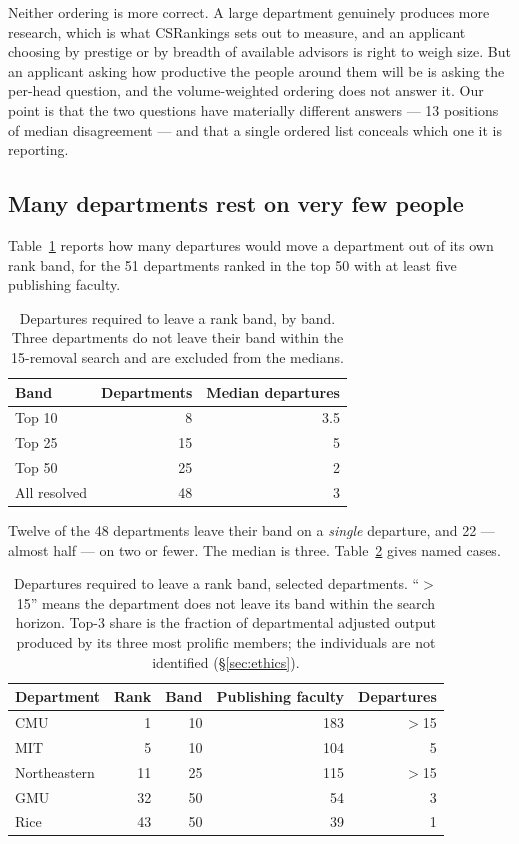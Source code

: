 \documentclass[11pt]{article}
\newcommand{\csr}{CSRankings}
\begin{document}
Neither ordering is more correct. A large department genuinely produces more
research, which is what \csr{} sets out to measure, and an applicant choosing
by prestige or by breadth of available advisors is right to weigh size. But an
applicant asking how productive the people around them will be is asking the
per-head question, and the volume-weighted ordering does not answer it. Our
point is that the two questions have materially different answers --- 13
positions of median disagreement --- and that a single ordered list conceals
which one it is reporting.

\subsection{Many departments rest on very few people}
\label{sec:fragilityresults}

Table~\ref{tab:fragility} reports how many departures would move a department
out of its own rank band, for the 51 departments ranked in the top 50 with at
least five publishing faculty.

\begin{table}[t]
\centering
\caption{Departures required to leave a rank band, by band. Three departments do
not leave their band within the 15-removal search and are excluded from the
medians.}
\label{tab:fragility}
\begin{tabular}{lrr}
\toprule
Band & Departments & Median departures \\
\midrule
Top 10  & 8  & 3.5 \\
Top 25  & 15 & 5 \\
Top 50  & 25 & 2 \\
\midrule
All resolved & 48 & 3 \\
\bottomrule
\end{tabular}
\end{table}

Twelve of the 48 departments leave their band on a \emph{single} departure, and
22 --- almost half --- on two or fewer. The median is three.
Table~\ref{tab:fragileexamples} gives named cases.

\begin{table}[t]
\centering
\caption{Departures required to leave a rank band, selected departments.
``$>$15'' means the department does not leave its band within the search
horizon. Top-3 share is the fraction of departmental adjusted output produced
by its three most prolific members; the individuals are not identified
(\S\ref{sec:ethics}).}
\label{tab:fragileexamples}
\begin{tabular}{lrrrr}
\toprule
Department & Rank & Band & Publishing faculty & Departures \\
\midrule
CMU          & 1  & 10 & 183 & $>$15 \\
MIT          & 5  & 10 & 104 & 5 \\
Northeastern & 11 & 25 & 115 & $>$15 \\
GMU          & 32 & 50 & 54  & 3 \\
Rice         & 43 & 50 & 39  & 1 \\
\bottomrule
\end{tabular}
\end{table}
\end{document}
